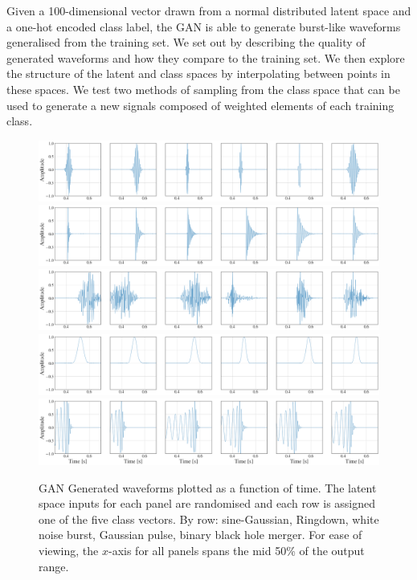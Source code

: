 \documentclass[12pt]{iopart}
\begin{document}
%
Given a 100-dimensional vector drawn from a normal distributed latent space and a one-hot encoded class
label, the GAN is able to generate burst-like waveforms generalised from the
training set. We set out by describing the quality of generated waveforms and
how they compare to the training set. We then explore the structure of the
latent and class spaces by interpolating between points in these spaces. We
test two methods of sampling from the class space that can be used to generate
a new signals composed of weighted elements of each training class.
\begin{figure}[!h]
    \centering
    \includegraphics[width=\textwidth]{figures/generations/sg.png}
    \includegraphics[width=\textwidth]{figures/generations/rd.png}
    \includegraphics[width=\textwidth]{figures/generations/wnb.png}
    \includegraphics[width=\textwidth]{figures/generations/blip.png}
    \includegraphics[width=\textwidth]{figures/generations/bbh.png}
    \caption{\ac{GAN} Generated waveforms plotted as a function of time. The latent space inputs for each panel are randomised and each row is assigned one of the five class vectors. By row: sine-Gaussian, Ringdown,
white noise burst, Gaussian pulse, binary black hole merger. For ease of viewing, the $x$-axis for all panels spans the mid 50\% of the output range.}
\label{fig:gen_signals} 
\end{figure}
\end{document}
